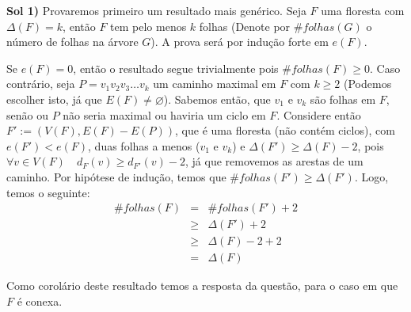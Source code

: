
 {\bf Sol 1)} Provaremos primeiro um resultado mais genérico.
%
Seja $F$ uma floresta com $\Delta(F) = k$, então $F$ tem pelo menos $k$ folhas (Denote por $\# folhas(G)$ o número de folhas na árvore $G$). A prova será por indução forte em $e(F)$.

Se $e(F) = 0$, então o resultado segue trivialmente pois $\# folhas(F) \ge 0$.
%
Caso contrário, seja $P = v_1v_2v_3\ldots v_k$ um caminho maximal em $F$ com $k \ge 2$ (Podemos escolher isto, já que $E(F) \ne \varnothing$).
%
Sabemos então, que $v_1$ e $v_k$ são folhas em $F$, senão ou $P$ não seria maximal ou haviria um ciclo em $F$.
%
Considere então $F' := (V(F),E(F)-E(P))$, que é uma floresta (não contém ciclos), com $e(F') < e(F)$, duas folhas a menos ($v_1$ e $v_k$) e $\Delta(F') \ge \Delta(F) - 2$, pois $\forall v\in V(F)\quad d_F(v) \ge d_{F'}(v) - 2$, já que removemos as arestas de um caminho.
%
Por hipótese de indução, temos que $\# folhas(F') \ge \Delta(F')$.
%
Logo, temos o seguinte: 
\begin{eqnarray}
	\#folhas(F) &=& \# folhas(F') + 2  \nonumber \\
		  &\ge& \Delta(F') + 2 	   \nonumber \\
		  &\ge& \Delta(F) - 2 + 2  \nonumber \\
		    &=& \Delta(F) \nonumber
\end{eqnarray}
\fimprova

Como corolário deste resultado temos a resposta da questão, para o caso em que $F$ é conexa.\\

